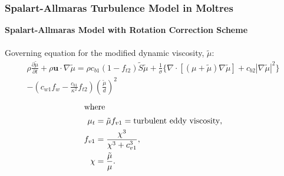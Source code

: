 \begin{frame}
  \frametitle{Spalart-Allmaras Turbulence Model in Moltres}
  \textbf{Spalart-Allmaras Model with Rotation Correction Scheme
  \cite{spalart_one-equation_1994, aupoix_extensions_2003, dacles-mariani_numericalexperimental_1995}}\\
  \\
  Governing equation for the modified dynamic viscosity, $\tilde{\mu}$:
  \begin{multline}
    \rho \frac{\partial\tilde{\mu}}{\partial t} + \rho \mathbf{u}\cdot\nabla\tilde{\mu} = \rho c_{b1}
    \left(1-f_{t2}\right)\tilde{S}\tilde{\mu} + \frac{1}{\sigma}\{\nabla\cdot\left[\left(\mu+
    \tilde{\mu}\right)\nabla\tilde{\mu}\right] + c_{b2}|\nabla\tilde{\mu}|^2\} \\
    - \left(c_{w1}f_w - \frac{c_{b1}}{\kappa^2}f_{t2}\right)\left(\frac{\tilde{\mu}}{d}\right)^2
  \end{multline}
  \begin{align*}
    \shortintertext{where}
      \mu_t &= \tilde{\mu}f_{v1} = \text{turbulent eddy viscosity}, \\
      f_{v1} &= \frac{\chi^3}{\chi^3 + c_{v1}^3}, \\
      \chi &= \frac{\tilde{\mu}}{\mu}.
  \end{align*}
\end{frame}

